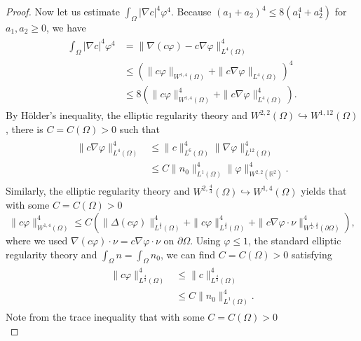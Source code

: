 \documentclass{amsart}
\numberwithin{equation}{section}
\newcommand{\R}{{ \mathbb{R}  }}
\newcommand{\bke}[1]{\left( #1 \right)}
\begin{document}
\begin{proof}
Now let us estimate $\int_{\Omega}|\nabla c|^{4}\varphi^{4}$. 
Because $(a_{1}+a_{2})^{4}\le 8(a_{1}^{4}+a_{2}^{4})$ for $a_{1},a_{2}\ge 0$, we have
\begin{align}\label{DEC20_0}
\begin{aligned}
\int_{\Omega}|\nabla c|^{4}\varphi^{4} &=\|\nabla( c \varphi)- c\nabla \varphi   \|^{4}_{L^{4}(\Omega)}
\\& \le \bke{ \| c\varphi \|_{W^{1,4}(\Omega)}      +\|c\nabla \varphi  \|_{L^{4}(\Omega)}   }^{4}
\\& \le 8\bke{ \| c\varphi \|_{W^{1,4}(\Omega)}^{4}      +\|c\nabla \varphi  \|_{L^{4}(\Omega)}^{4}   }.
\end{aligned}
\end{align}
By H\"older's inequality, the elliptic regularity theory and $W^{2,2}(\Omega)\hookrightarrow W^{1,12}(\Omega)$, there is $C=C(\Omega)>0$ such that
\begin{align}\label{DEC20_1}
\begin{aligned}
\|c\nabla \varphi\|_{L^{4}(\Omega)}^{4} &\le \|c\|_{L^{6}(\Omega)}^{4}\|\nabla \varphi\|_{L^{12}(\Omega)}^{4}
\\& \le C\|n_{0}\|_{L^{1}(\Omega)}^{4}\|\varphi\|_{W^{2,2}(\R^{2})}^{4}.
\end{aligned}
\end{align}
Similarly, the elliptic regularity theory and  $W^{2,\frac{4}{3}}(\Omega) \hookrightarrow W^{1,4}(\Omega)$ yields that with some $C=C(\Omega)>0$
\begin{equation}\label{DEC20_2}
\| c\varphi \|_{W^{1,4}(\Omega)}^{4} \le C\bke{  \| \Delta (c\varphi) \|_{L^{\frac{4}{3}}(\Omega)}^{4}+ \|  c\varphi \|_{L^{\frac{4}{3}}(\Omega)}^{4}  + \|c\nabla \varphi\cdot\nu\|_{W^{\frac{1}{4},\frac{4}{3}}(\partial\Omega)}^{4} },
\end{equation}
where we used
$
\nabla (c\varphi)\cdot\nu =c\nabla \varphi\cdot\nu$ on  $\partial\Omega$.
Using $ \varphi \le 1$, the standard elliptic regularity theory and $\int_{\Omega}n=\int_{\Omega}n_{0}$, we can find
$C=C(\Omega)>0$  satisfying
\begin{align}\label{DEC20_3}
\begin{aligned}
\|  c\varphi \|_{L^{\frac{4}{3}}(\Omega)}^{4}& \le \|c\|_{L^{\frac{4}{3}}(\Omega)}^{4}
 \\&\le C\|n_{0}\|_{L^{1}(\Omega)}^{4}.
\end{aligned}
\end{align}
Note   from the trace inequality that with some
$C=C(\Omega)>0$ 
\begin{equation}\label{DEC20_4}

\end{equation}
\end{proof}
\end{document}
